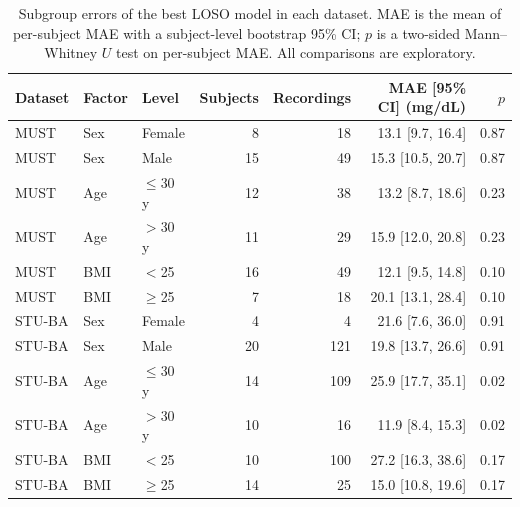 \begin{table}[htbp]\centering\small
\caption{Subgroup errors of the best LOSO model in each dataset. MAE is the mean of per-subject MAE with a subject-level bootstrap 95\% CI; $p$ is a two-sided Mann--Whitney $U$ test on per-subject MAE. All comparisons are exploratory.}\label{tab:subgroup}
\begin{tabular}{lllrrrr}\hline
Dataset&Factor&Level&Subjects&Recordings&MAE [95\% CI] (mg/dL)&$p$\\\hline
MUST&Sex&Female&8&18&13.1 [9.7, 16.4]&0.87\\
MUST&Sex&Male&15&49&15.3 [10.5, 20.7]&0.87\\
MUST&Age&$\le$30 y&12&38&13.2 [8.7, 18.6]&0.23\\
MUST&Age&$>$30 y&11&29&15.9 [12.0, 20.8]&0.23\\
MUST&BMI&$<$25&16&49&12.1 [9.5, 14.8]&0.10\\
MUST&BMI&$\ge$25&7&18&20.1 [13.1, 28.4]&0.10\\
STU-BA&Sex&Female&4&4&21.6 [7.6, 36.0]&0.91\\
STU-BA&Sex&Male&20&121&19.8 [13.7, 26.6]&0.91\\
STU-BA&Age&$\le$30 y&14&109&25.9 [17.7, 35.1]&0.02\\
STU-BA&Age&$>$30 y&10&16&11.9 [8.4, 15.3]&0.02\\
STU-BA&BMI&$<$25&10&100&27.2 [16.3, 38.6]&0.17\\
STU-BA&BMI&$\ge$25&14&25&15.0 [10.8, 19.6]&0.17\\
\hline\end{tabular}\end{table}